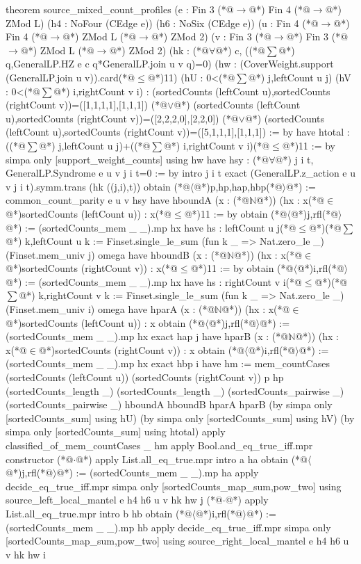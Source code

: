 theorem source_mixed_count_profiles (e : Fin 3 (*@$\to$@*) Fin 4 (*@$\to$@*) ZMod L)
    (h4 : NoFour (CEdge e)) (h6 : NoSix (CEdge e))
    (u : Fin 4 (*@$\to$@*) Fin 4 (*@$\to$@*) ZMod L (*@$\to$@*) ZMod 2)
    (v : Fin 3 (*@$\to$@*) Fin 3 (*@$\to$@*) ZMod L (*@$\to$@*) ZMod 2)
    (hk : (*@$\forall$@*) c, ((*@$\sum$@*) q,GeneralLP.HZ e c q*GeneralLP.join u v q)=0)
    (hw : (CoverWeight.support (GeneralLP.join u v)).card(*@$\le$@*)11)
    (hU : 0<(*@$\sum$@*) j,leftCount u j) (hV : 0<(*@$\sum$@*) i,rightCount v i) :
    (sortedCounts (leftCount u),sortedCounts (rightCount v))=([1,1,1,1],[1,1,1]) (*@$\lor$@*)
    (sortedCounts (leftCount u),sortedCounts (rightCount v))=([2,2,2,0],[2,2,0]) (*@$\lor$@*)
    (sortedCounts (leftCount u),sortedCounts (rightCount v))=([5,1,1,1],[1,1,1]) := by
  have htotal : ((*@$\sum$@*) j,leftCount u j)+((*@$\sum$@*) i,rightCount v i)(*@$\le$@*)11 := by
    simpa only [support_weight_counts] using hw
  have hsy : (*@$\forall$@*) j i t, GeneralLP.Syndrome e u v j i t=0 := by
    intro j i t
    exact (GeneralLP.z_action e u v j i t).symm.trans (hk ((j,i),t))
  obtain (*@$\langle$@*)p,hp,hap,hbp(*@$\rangle$@*) := common_count_parity e u v hsy
  have hboundA (x : (*@$\mathbb N$@*)) (hx : x(*@$\in$@*)sortedCounts (leftCount u)) : x(*@$\le$@*)11 := by
    obtain (*@$\langle$@*)j,rfl(*@$\rangle$@*) := (sortedCounts_mem _ _).mp hx
    have hs : leftCount u j(*@$\le$@*)(*@$\sum$@*) k,leftCount u k :=
      Finset.single_le_sum (fun k _ => Nat.zero_le _) (Finset.mem_univ j)
    omega
  have hboundB (x : (*@$\mathbb N$@*)) (hx : x(*@$\in$@*)sortedCounts (rightCount v)) : x(*@$\le$@*)11 := by
    obtain (*@$\langle$@*)i,rfl(*@$\rangle$@*) := (sortedCounts_mem _ _).mp hx
    have hs : rightCount v i(*@$\le$@*)(*@$\sum$@*) k,rightCount v k :=
      Finset.single_le_sum (fun k _ => Nat.zero_le _) (Finset.mem_univ i)
    omega
  have hparA (x : (*@$\mathbb N$@*)) (hx : x(*@$\in$@*)sortedCounts (leftCount u)) : x%
    obtain (*@$\langle$@*)j,rfl(*@$\rangle$@*) := (sortedCounts_mem _ _).mp hx
    exact hap j
  have hparB (x : (*@$\mathbb N$@*)) (hx : x(*@$\in$@*)sortedCounts (rightCount v)) : x%
    obtain (*@$\langle$@*)i,rfl(*@$\rangle$@*) := (sortedCounts_mem _ _).mp hx
    exact hbp i
  have hm := mem_countCases (sortedCounts (leftCount u)) (sortedCounts (rightCount v)) p hp
    (sortedCounts_length _) (sortedCounts_length _) (sortedCounts_pairwise _)
    (sortedCounts_pairwise _) hboundA hboundB hparA hparB
    (by simpa only [sortedCounts_sum] using hU)
    (by simpa only [sortedCounts_sum] using hV)
    (by simpa only [sortedCounts_sum] using htotal)
  apply classified_of_mem_countCases _ hm
  apply Bool.and_eq_true_iff.mpr
  constructor
  (*@$\cdot$@*) apply List.all_eq_true.mpr
    intro a ha
    obtain (*@$\langle$@*)j,rfl(*@$\rangle$@*) := (sortedCounts_mem _ _).mp ha
    apply decide_eq_true_iff.mpr
    simpa only [sortedCounts_map_sum,pow_two] using source_left_local_mantel e h4 h6 u v hk hw j
  (*@$\cdot$@*) apply List.all_eq_true.mpr
    intro b hb
    obtain (*@$\langle$@*)i,rfl(*@$\rangle$@*) := (sortedCounts_mem _ _).mp hb
    apply decide_eq_true_iff.mpr
    simpa only [sortedCounts_map_sum,pow_two] using source_right_local_mantel e h4 h6 u v hk hw i
